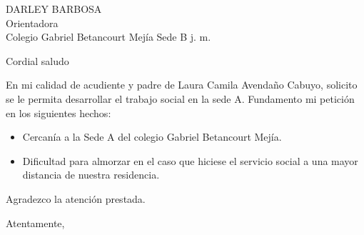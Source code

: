 \documentclass[letterpaper,spanish,11pt]{letter}
\begin{document}
\begin{letter}{DARLEY BARBOSA\\Orientadora\\Colegio Gabriel Betancourt Mejía Sede B j. m.}
	
\opening{Cordial saludo}
En mi calidad de acudiente y padre de Laura Camila Avendaño Cabuyo, solicito se le permita desarrollar el trabajo social en la sede A. Fundamento mi petición en los siguientes hechos:
\begin{itemize}
\item Cercan\'{i}a a la Sede A del colegio Gabriel Betancourt Mej\'{i}a.
\item Dificultad para almorzar en el caso que hiciese el servicio social a una mayor distancia de nuestra residencia.
\end{itemize}
Agradezco la atenci\'{o}n prestada.
\closing{Atentamente,}


\end{letter}
\end{document}
